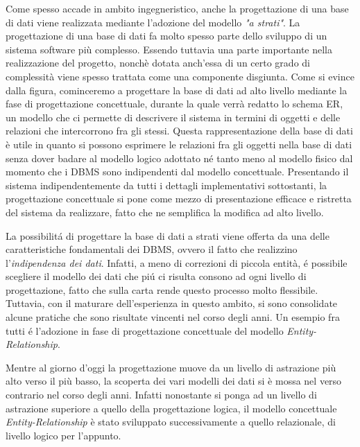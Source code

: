 \documentclass[12pt,a4paper,onecolumn,x11names]{article}
\begin{document}
		Come spesso accade in ambito ingegneristico, anche la progettazione di una base di dati viene realizzata mediante l'adozione del modello \textit{"a strati"}. \newline
		La progettazione di una base di dati fa molto spesso parte dello sviluppo di un sistema software più complesso. Essendo tuttavia una parte importante nella realizzazione del progetto, nonchè dotata anch'essa di un certo grado di complessità viene spesso trattata come una componente disgiunta.\newline		
		Come si evince dalla figura, cominceremo a progettare la base di dati ad alto livello mediante la fase di progettazione concettuale, durante la quale verrà redatto lo schema ER, un modello che ci permette di descrivere il sistema in termini di oggetti e delle relazioni che intercorrono fra gli stessi. Questa rappresentazione della base di dati è utile in quanto si possono  esprimere le relazioni fra gli oggetti nella base di dati senza dover badare al modello logico adottato né tanto meno al modello fisico dal momento che i DBMS sono indipendenti dal modello concettuale. Presentando il sistema indipendentemente da tutti i dettagli implementativi sottostanti, la progettazione concettuale si pone come mezzo di presentazione efficace e ristretta del sistema da realizzare, fatto che ne semplifica la modifica ad alto livello. \newline	
		
		La possibilit\'{a} di progettare la base di dati a strati viene offerta da una delle caratteristiche fondamentali dei DBMS, ovvero il fatto che realizzino l'\textit{indipendenza dei dati}. Infatti, a meno di correzioni di piccola entità, \'{e} possibile scegliere il modello dei dati che pi\'{u} ci risulta consono ad ogni livello di progettazione, fatto che sulla carta rende questo processo molto flessibile. Tuttavia, con il maturare dell'esperienza in questo ambito, si sono consolidate alcune pratiche che sono risultate vincenti nel corso degli anni. Un esempio fra tutti \'{e} l'adozione in fase di progettazione concettuale del modello \textit{Entity-Relationship}.\newline
		
		Mentre al giorno d'oggi la progettazione muove da un livello di astrazione più alto verso il più basso, la scoperta dei vari modelli dei dati si è mossa nel verso contrario nel corso degli anni. Infatti nonostante si ponga ad un livello di astrazione superiore a quello della progettazione logica, il modello concettuale \textit{Entity-Relationship} è stato sviluppato successivamente a quello relazionale, di livello logico per l'appunto.\newline
		
\end{document}
